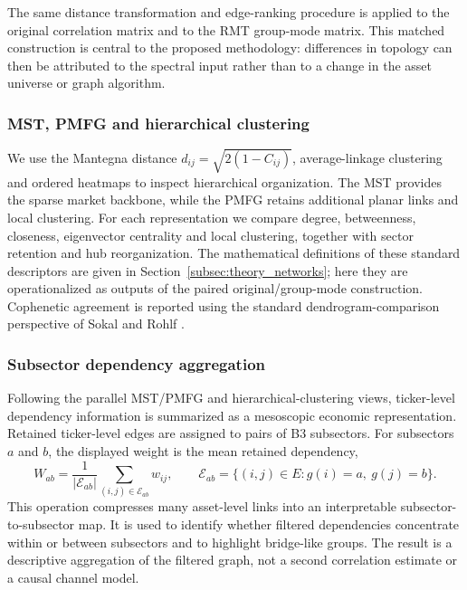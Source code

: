 The same distance transformation and edge-ranking procedure is applied to the original correlation matrix and to the RMT group-mode matrix. This matched construction is central to the proposed methodology: differences in topology can then be attributed to the spectral input rather than to a change in the asset universe or graph algorithm.

\subsubsection{MST, PMFG and hierarchical clustering}
\label{subsec:distance_clustering_method}

We use the Mantegna distance $d_{ij}=\sqrt{2(1-C_{ij})}$, average-linkage clustering and ordered heatmaps to inspect hierarchical organization. The MST provides the sparse market backbone, while the PMFG retains additional planar links and local clustering. For each representation we compare degree, betweenness, closeness, eigenvector centrality and local clustering, together with sector retention and hub reorganization. The mathematical definitions of these standard descriptors are given in Section~\ref{subsec:theory_networks}; here they are operationalized as outputs of the paired original/group-mode construction. Cophenetic agreement is reported using the standard dendrogram-comparison perspective of Sokal and Rohlf \cite{sokal_rohlf_1962}.

\subsubsection{Subsector dependency aggregation}
\label{subsec:subsector_network_method}

Following the parallel MST/PMFG and hierarchical-clustering views, ticker-level dependency information is summarized as a mesoscopic economic representation. Retained ticker-level edges are assigned to pairs of B3 subsectors. For subsectors $a$ and $b$, the displayed weight is the mean retained dependency,
\begin{equation}
W_{ab}=\frac{1}{|\mathcal{E}_{ab}|}\sum_{(i,j)\in\mathcal{E}_{ab}}w_{ij},
\qquad \mathcal{E}_{ab}=\{(i,j)\in E:g(i)=a,\ g(j)=b\}.
\end{equation}
This operation compresses many asset-level links into an interpretable subsector-to-subsector map. It is used to identify whether filtered dependencies concentrate within or between subsectors and to highlight bridge-like groups. The result is a descriptive aggregation of the filtered graph, not a second correlation estimate or a causal channel model.

